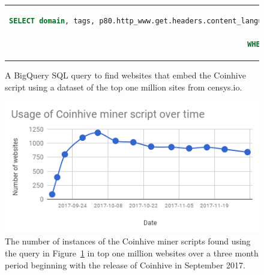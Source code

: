 \begin{figure}[t]
\begin{tabular}{c}
\begin{lstlisting}[language=sql]
SELECT domain, tags, p80.http_www.get.headers.content_language, p80.http_www.get.headers.server, p80.http.get.headers.x_powered_by, p80.http.get.title, p80.http_www.get.body as wwwbody, p80.http.get.body as plainbody 
FROM censys-io.domain_public.20171123
WHERE STRPOS(p80.http.get.body, coinhive.min.js) > 0 or STRPOS(p80.http_www.get.body, coinhive.min.js) >0)
\end{lstlisting}
\end{tabular}
\caption{A BigQuery SQL query to find websites that embed the Coinhive script using a dataset of the top one million sites from censys.io. \label{lst:bigquery}}
\end{figure}

\begin{figure}[t]
\centering
\includegraphics[width=\linewidth]{figures/usage_of_coinhive_over_time.png}
\caption{The number of instances of the Coinhive miner scripts found using the query in Figure~\ref{lst:bigquery} in top one million websites over a three month period beginning with the release of Coinhive in September 2017.\label{fig:topmil}}
\end{figure}

